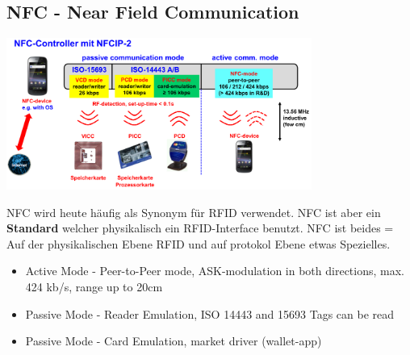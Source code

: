 	
\subsection{NFC - Near Field Communication}
	
	\begin{minipage}{10cm}
		\includegraphics[width=10cm]{./bilder/rfid-nfc.png} 
	\end{minipage}
			
	NFC wird heute häufig als Synonym für RFID verwendet. NFC ist aber ein \textbf{Standard} welcher physikalisch ein RFID-Interface benutzt. 
	NFC ist beides = Auf der physikalischen Ebene RFID und auf protokol Ebene etwas Spezielles.
	\begin{itemize}
		\item Active Mode - Peer-to-Peer mode, ASK-modulation in both directions, max. 424 kb/s, range up to 20cm
		\item Passive Mode - Reader Emulation, ISO 14443 and 15693 Tags can be read
		\item Passive Mode - Card Emulation, market driver (wallet-app)
	\end{itemize}
	
	